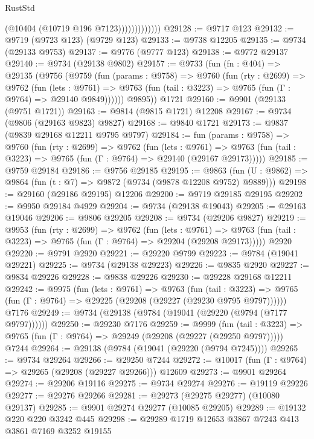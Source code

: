 \begin{lexlean}{RustStd}
\begin{coremodule}
                          (@10404 (@10719 @196 @7123)))))))))))))
@29128 := @9717 @123
@29132 := @9719 (@9723 @123) (@9729 @123)
@29133 := @9738 @12205
@29135 := @9734 (@29133 @9753)
@29137 := @9776 (@9777 @123)
@29138 := @9772 @29137
@29140 := @9734 (@29138 @9802)
@29157 := @9733
    (fun (fn : @404) =>
    @29135
      (@9756
        (@9759
          (fun (params : @9758) =>
          @9760
            (fun (rty : @2699) =>
            @9762
              (fun (lets : @9761) =>
              @9763 (fun (tail : @3223) => @9765 (fun (Γ : @9764) => @29140 @9849))))))
        @9895))
    @1721
@29160 := @9901 (@29133 (@9751 @1721))
@29163 := @9814 (@9815 @1721) @12208
@29167 := @9734 (@9806 (@29163 @9823) @9827)
@29168 := @9840 @1721
@29173 := @9837 (@9839 @29168 @12211 @9795 @9797)
@29184 := fun (params : @9758) =>
  @9760
    (fun (rty : @2699) =>
    @9762
      (fun (lets : @9761) =>
      @9763 (fun (tail : @3223) => @9765 (fun (Γ : @9764) => @29140 (@29167 @29173)))))
@29185 := @9759 @29184
@29186 := @9756 @29185
@29195 := @9863
    (fun (U : @9862) => @9864 (fun (t : @7) => @9872 (@9734 (@9878 @12208 @9752) @9889)))
@29198 := @29160 (@29186 @29195) @12206
@29200 := @9719 @29185 @29195
@29202 := @9950 @29184 @4929
@29204 := @9734 (@29138 @19043)
@29205 := @29163 @19046
@29206 := @9806 @29205
@29208 := @9734 (@29206 @9827)
@29219 := @9953
    (fun (rty : @2699) =>
    @9762
      (fun (lets : @9761) =>
      @9763 (fun (tail : @3223) => @9765 (fun (Γ : @9764) => @29204 (@29208 @29173)))))
    @2920
@29220 := @9791 @2920
@29221 := @29220 @9799
@29223 := @9784 (@19041 @29221)
@29225 := @9734 (@29138 @29223)
@29226 := @9835 @2920
@29227 := @9834 @29226
@29228 := @9838 @29226
@29230 := @29228 @29168 @12211
@29242 := @9975
    (fun (lets : @9761) =>
    @9763
      (fun (tail : @3223) =>
      @9765 (fun (Γ : @9764) => @29225 (@29208 (@29227 (@29230 @9795 @9797))))))
    @7176
@29249 := @9734 (@29138 (@9784 (@19041 (@29220 (@9794 (@7177 @9797))))))
@29250 := @29230 @7176
@29259 := @9999
    (fun (tail : @3223) => @9765 (fun (Γ : @9764) => @29249 (@29208 (@29227 (@29250 @9797)))))
    @7244
@29264 := @29138 (@9784 (@19041 (@29220 (@9794 @7245))))
@29265 := @9734 @29264
@29266 := @29250 @7244
@29272 := @10017 (fun (Γ : @9764) => @29265 (@29208 (@29227 @29266))) @12609
@29273 := @9901 @29264
@29274 := @29206 @19116
@29275 := @9734 @29274
@29276 := @19119 @29226
@29277 := @29276 @29266
@29281 := @29273 (@29275 @29277) (@10080 @29137)
@29285 := @9901 @29274 @29277 (@10085 @29205)
@29289 := @19132 @220 @220 @3242 @445
@29298 := @29289 @1719 @12653 @3867 @7243 @413 @3861 @7169 @3252 @19155

\end{coremodule}
\end{lexlean}
